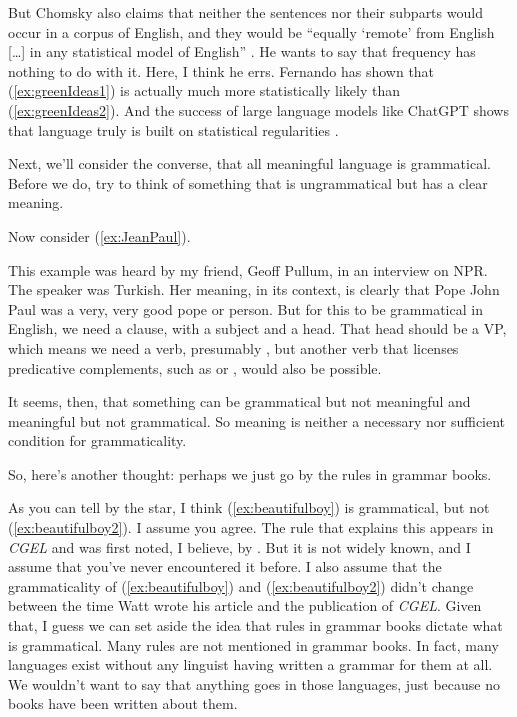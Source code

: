 But Chomsky also claims that neither the sentences nor their subparts would occur in a corpus of English, and they would be \enquote{equally `remote' from English [\dots] in any statistical model of English} \citep[16]{Chomsky2002-ko}. He wants to say that frequency has nothing to do with it. Here, I think he errs. Fernando \textcite{Pereira2000} has shown that (\ref{ex:greenIdeas1}) is actually much more statistically likely than (\ref{ex:greenIdeas2}). And the success of large language models like ChatGPT shows that language truly is built on statistical regularities \citep{Kallini2024}.

Next, we'll consider the converse, that all meaningful language is grammatical. Before we do, try to think of something that is ungrammatical but has a clear meaning.

Now consider (\ref{ex:JeanPaul}).

\label{ex:JeanPaul}
\z
This example was heard by my friend, Geoff Pullum, in an interview on NPR. The speaker was Turkish. Her meaning, in its context, is clearly that Pope John Paul was a very, very good pope or person. But for this to be grammatical in English, we need a clause, with a subject and a head. That head should be a VP, which means we need a verb, presumably , but another verb that licenses predicative complements, such as  or , would also be possible.

It seems, then, that something can be grammatical but not meaningful and meaningful but not grammatical. So meaning is neither a necessary nor sufficient condition for grammaticality.

So, here's another thought: perhaps we just go by the rules in grammar books.

\ea
    \label{ex:beautifulboy}
    \label{ex:beautifulboy2}
    \z
\z
As you can tell by the star, I think (\ref{ex:beautifulboy}) is grammatical, but not (\ref{ex:beautifulboy2}). I assume you agree. The rule that explains this appears in \textit{CGEL} \citep[561]{Huddleston2002} and was first noted, I believe, by \textcite{Watt1968}. But it is not widely known, and I assume that you've never encountered it before. I also assume that the grammaticality of (\ref{ex:beautifulboy}) and (\ref{ex:beautifulboy2}) didn't change between the time Watt wrote his article and the publication of \textit{CGEL}. Given that, I guess we can set aside the idea that rules in grammar books dictate what is grammatical. Many rules are not mentioned in grammar books. In fact, many languages exist without any linguist having written a grammar for them at all. We wouldn't want to say that anything goes in those languages, just because no books have been written about them.

